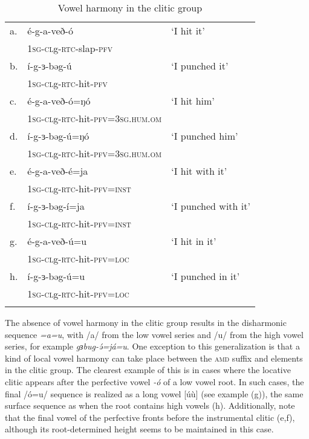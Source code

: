 \begin{table} %
\caption{Vowel harmony in the clitic group} \label{tab:ch11:cliticharm}
\begin{tabular}[t]{lll}
\lsptoprule
a. & é-g-a-veð-ó & `I hit it'\\
 	& \textsc{1sg}-\textsc{cl}g-\textsc{rtc}-slap-\textsc{pfv} & \\
b. & í-g-ɜ-bəg-ú & `I punched it'\\
 	& \textsc{1sg}-\textsc{cl}g-\textsc{rtc}-hit-\textsc{pfv} & \\
c. & é-g-a-veð-ó=ŋó & `I hit him'\\
 	& \textsc{1sg}-\textsc{cl}g-\textsc{rtc}-hit-\textsc{pfv}=\textsc{3sg.hum.om} & \\
d. & í-g-ɜ-bəg-ú=ŋó & `I punched him'\\
 	& \textsc{1sg}-\textsc{cl}g-\textsc{rtc}-hit-\textsc{pfv}=\textsc{3sg.hum.om} & \\
e. & é-g-a-veð-é=ja & `I hit with it'\\
 	& \textsc{1sg}-\textsc{cl}g-\textsc{rtc}-hit-\textsc{pfv}=\textsc{inst} & \\
f. & í-g-ɜ-bəg-í=ja & `I punched with it'\\
 	& \textsc{1sg}-\textsc{cl}g-\textsc{rtc}-hit-\textsc{pfv}=\textsc{inst} & \\
g. & é-g-a-veð-ú=u & `I hit in it'\\
 	& \textsc{1sg}-\textsc{cl}g-\textsc{rtc}-hit-\textsc{pfv}=\textsc{loc} & \\
h. & í-g-ɜ-bəg-ú=u & `I punched in it'\\
 	& \textsc{1sg}-\textsc{cl}g-\textsc{rtc}-hit-\textsc{pfv}=\textsc{loc} & \\
\lspbottomrule
\end{tabular}
\end{table}
The absence of vowel harmony in the clitic group results in the disharmonic sequence \textit{=a=u}, with /a/ from the low vowel series and /u/ from the high vowel series, for example \textit{gɜbug-ə́=já=u}. One exception to this generalization is that a kind of local vowel harmony can take place between the \textsc{amd} suffix and elements in the clitic group. The clearest example of this is in cases where the locative clitic appears after the perfective vowel \textit{-ó} of a low vowel root. In such cases, the final /ó=u/ sequence is realized as a long vowel [úù] (see example (g)), the same surface sequence as when the root contains high vowels (h). Additionally, note that the final vowel of the perfective fronts before the instrumental clitic (e,f), although its root-determined height seems to be maintained in this case. %

